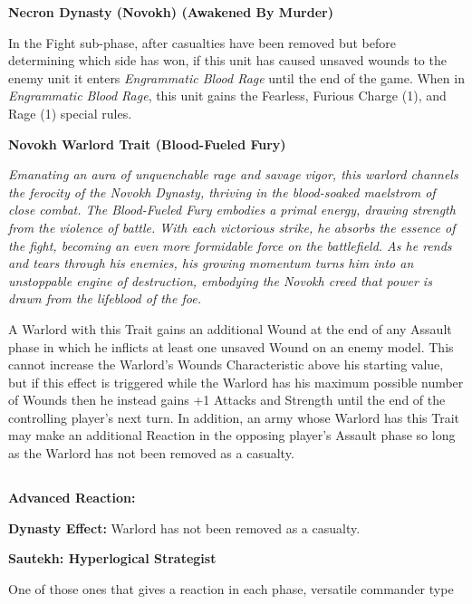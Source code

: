 \begin{multicols}{2}
	\textbf{Necron Dynasty (Novokh) (Awakened By Murder)}
	
	In the Fight sub-phase, after casualties have been removed but before determining which side has won, if this unit has caused unsaved wounds to the enemy unit it enters \textit{Engrammatic Blood Rage} until the end of the game. When in \textit{Engrammatic Blood Rage}, this unit gains the Fearless, Furious Charge (1), and Rage (1) special rules.
	
	\textbf{Novokh Warlord Trait (Blood-Fueled Fury)}
	
	\textit{Emanating an aura of unquenchable rage and savage vigor, this warlord channels the ferocity of the Novokh Dynasty, thriving in the blood-soaked maelstrom of close combat. The Blood-Fueled Fury embodies a primal energy, drawing strength from the violence of battle. With each victorious strike, he absorbs the essence of the fight, becoming an even more formidable force on the battlefield. As he rends and tears through his enemies, his growing momentum turns him into an unstoppable engine of destruction, embodying the Novokh creed that power is drawn from the lifeblood of the foe.}
	
	A Warlord with this Trait gains an additional Wound at the end of any Assault phase in which he inflicts at least one unsaved Wound on an enemy model. This cannot increase the Warlord’s Wounds Characteristic above his starting value, but if this effect is triggered while the Warlord has his maximum possible number of Wounds then he instead gains +1 Attacks and Strength until the end of the controlling player’s next turn. In addition, an army whose Warlord has this Trait may make an additional Reaction in the opposing player’s Assault phase so long as the Warlord has not been removed as a casualty.
\end{multicols}



\newpage
\subsection[Sautekh]{}

\textbf{Advanced Reaction:}

\textbf{Dynasty Effect:}
Warlord has not been removed as a casualty.

\textbf{Sautekh: Hyperlogical Strategist}

One of those ones that gives a reaction in each phase, versatile commander type


